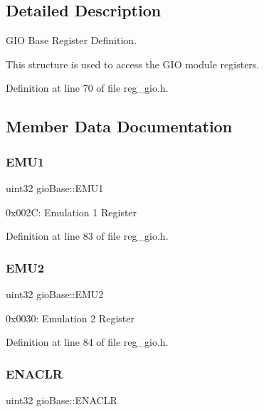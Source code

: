 \subsection{Detailed Description}
G\+IO Base Register Definition. 

This structure is used to access the G\+IO module registers. 

Definition at line 70 of file reg\+\_\+gio.\+h.



\subsection{Member Data Documentation}
\mbox{\label{structgioBase_a24df703ab1ed74c4c1f258c656ada852}} 
\subsubsection{\texorpdfstring{E\+M\+U1}{EMU1}}
{\footnotesize\ttfamily uint32 gio\+Base\+::\+E\+M\+U1}

0x002C\+: Emulation 1 Register 

Definition at line 83 of file reg\+\_\+gio.\+h.

\mbox{\label{structgioBase_ae95d7cff6fa91bb969d7c249e4e7651e}} 
\subsubsection{\texorpdfstring{E\+M\+U2}{EMU2}}
{\footnotesize\ttfamily uint32 gio\+Base\+::\+E\+M\+U2}

0x0030\+: Emulation 2 Register 

Definition at line 84 of file reg\+\_\+gio.\+h.

\mbox{\label{structgioBase_aa79d76885b40a0848fbdb73b38f92449}} 
\subsubsection{\texorpdfstring{E\+N\+A\+C\+LR}{ENACLR}}
{\footnotesize\ttfamily uint32 gio\+Base\+::\+E\+N\+A\+C\+LR}


